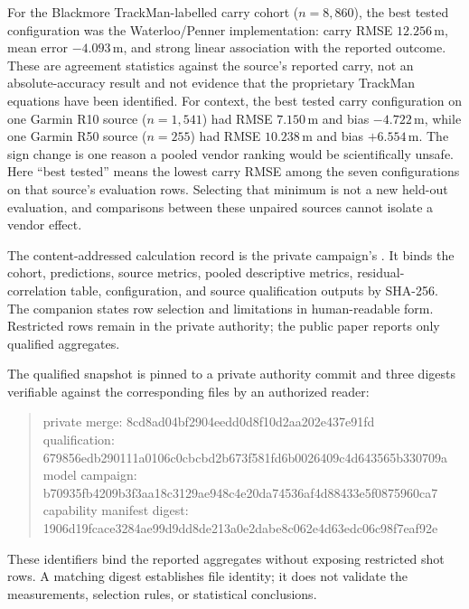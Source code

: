 For the Blackmore TrackMan-labelled carry cohort ($n=8{,}860$), the best tested
configuration was the Waterloo/Penner implementation: carry RMSE
$12.256$\,m, mean error $-4.093$\,m, and strong linear association with the
reported outcome. These are agreement statistics against the source's reported
carry, not an absolute-accuracy result and not evidence that the proprietary
TrackMan equations have been identified. For context, the best tested carry
configuration on one Garmin R10 source ($n=1{,}541$) had RMSE $7.150$\,m and
bias $-4.722$\,m, while one Garmin R50 source ($n=255$) had RMSE
$10.238$\,m and bias $+6.554$\,m. The sign change is one reason a pooled vendor
ranking would be scientifically unsafe.
Here ``best tested'' means the lowest carry RMSE among the seven configurations on that source's evaluation rows.
Selecting that minimum is not a new held-out evaluation, and comparisons between these unpaired sources cannot isolate a vendor effect.

The content-addressed calculation record is the private campaign's
. It binds the cohort,
predictions, source metrics, pooled descriptive metrics, residual-correlation
table, configuration, and source qualification outputs by SHA-256. The
companion  states row selection and
limitations in human-readable form. Restricted rows remain in the private
authority; the public paper reports only qualified aggregates.

The qualified snapshot is pinned to a private authority commit and three
digests verifiable against the corresponding files by an authorized reader:
\begin{quote}
\small\ttfamily
private merge: 8cd8ad04bf2904eedd0d8f10d2aa202e437e91fd\\
qualification:\\
679856edb290111a0106c0cbcbd2b673f\allowbreak{}581fd6b0026409c4d643565b330709a\\
model campaign:\\
b70935fb4209b3f3aa18c3129ae948c4e\allowbreak{}20da74536af4d88433e5f0875960ca7\\
capability manifest digest:\\
1906d19fcace3284ae99d9dd8de213a0e\allowbreak{}2dabe8c062e4d63edc06c98f7eaf92e
\end{quote}
These identifiers bind the reported aggregates without exposing restricted
shot rows.
A matching digest establishes file identity; it does not validate the measurements, selection rules, or statistical conclusions.


